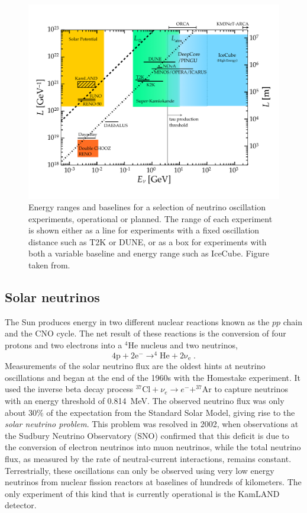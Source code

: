\begin{figure}
    \centering
    \includegraphics{figures/theory/LvsE.pdf}
    \caption{Energy ranges and baselines for a selection of neutrino oscillation experiments, operational or planned.  The range of each experiment is shown either as a line for experiments with a fixed oscillation distance such as T2K or DUNE, or as a box for experiments with both a variable baseline and energy range such as IceCube. Figure taken from\cite{IceCube:2016xxt}.\label{fig:oscillation-experiments-overview}}
\end{figure}

\subsection{Solar neutrinos}
The Sun produces energy in two different nuclear reactions known as the $pp$ chain and the CNO cycle. The net result of these reactions is the conversion of four protons and two electrons into a $\mathrm{^4He}$ nucleus and two neutrinos,
\begin{equation}
    \mathrm{4p + 2e^- \rightarrow ^4He + 2\nu_e }\;.
\end{equation}
Measurements of the solar neutrino flux are the oldest hints at neutrino oscillations and began at the end of the 1960s with the Homestake\cite{DAVIS199413} experiment.
It used the inverse beta decay process $^{37}\mathrm{Cl}+\nu_e \rightarrow e^- + ^{37}\mathrm{Ar}$ to capture neutrinos with an energy threshold of \SI{0.814}{MeV}.
The observed neutrino flux was only about 30\% of the expectation from the Standard Solar Model, giving rise to the \emph{solar neutrino problem}.
This problem was resolved in 2002, when observations at the Sudbury Neutrino Observatory (SNO) confirmed\cite{PhysRevLett.89.011301} that this deficit is due to the conversion of electron neutrinos into muon neutrinos, while the total neutrino flux, as measured by the rate of neutral-current interactions, remains constant.
Terrestrially, these oscillations can only be observed using very low energy neutrinos from nuclear fission reactors at baselines of hundreds of kilometers.
The only experiment of this kind that is currently operational is the KamLAND detector\cite{PhysRevLett.90.021802}.

